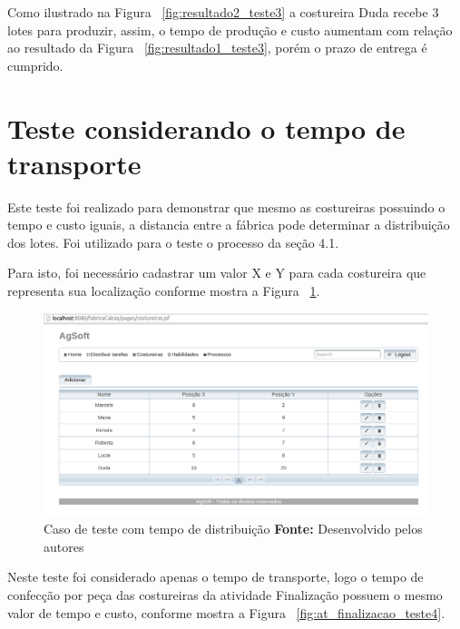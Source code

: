 \par Como ilustrado na Figura ~\ref{fig:resultado2_teste3} a costureira Duda
recebe 3 lotes para produzir, assim, o tempo de produção e custo aumentam com
relação ao resultado da Figura ~\ref{fig:resultado1_teste3}, porém o prazo de
entrega é cumprido.


\section{Teste considerando o tempo de transporte}

\par Este teste foi realizado para demonstrar que mesmo as costureiras possuindo
o tempo e custo iguais, a distancia entre a fábrica pode determinar a
distribuição dos lotes. Foi utilizado para o teste o processo da seção 4.1.


\par Para isto, foi necessário cadastrar um valor X e Y para cada costureira que
representa sua localização conforme mostra a Figura ~\ref{fig:add_xy_costureira_teste4}.

\newpage

\begin{figure}[h!]
	\centerline{\includegraphics[scale=0.3]{./imagens/posicao_xy_costureiras_teste4.png}}
	\caption[Caso de teste com tempo de distribuição]
	{Caso de teste com tempo de distribuição \textbf{Fonte:} Desenvolvido pelos autores}
	\label{fig:add_xy_costureira_teste4}
\end{figure}



\par Neste teste foi considerado apenas o tempo de transporte, logo o tempo de
confecção por peça das costureiras da atividade Finalização possuem o mesmo
valor de tempo e custo, conforme mostra a Figura
~\ref{fig:at_finalizacao_teste4}.


